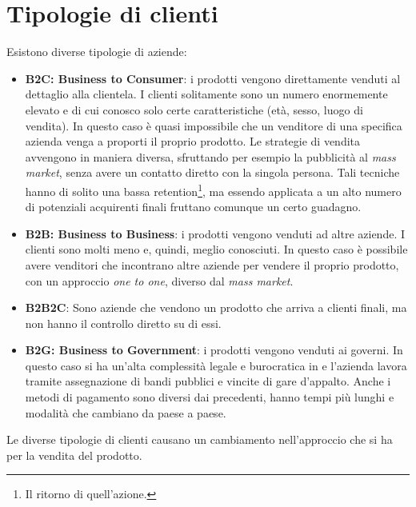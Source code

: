\section{Tipologie di clienti}

Esistono diverse tipologie di aziende:
\begin{itemize}
  \item \textbf{B2C: Business to Consumer}: i prodotti vengono direttamente
  venduti al dettaglio alla clientela. I clienti solitamente sono un numero
  enormemente elevato e di cui conosco solo certe caratteristiche (età, sesso,
  luogo di vendita). In questo caso è quasi impossibile che un venditore di una
  specifica azienda venga a proporti il proprio prodotto. Le strategie di
  vendita avvengono in maniera diversa, sfruttando per esempio la pubblicità al
  \textit{mass market}, senza avere un contatto diretto con la singola persona.
  Tali tecniche hanno di solito una bassa retention\footnote{Il ritorno di
  quell'azione.}, ma essendo applicata a un alto numero di potenziali
  acquirenti finali fruttano comunque un certo guadagno.

  \item \textbf{B2B: Business to Business}: i prodotti vengono venduti ad altre
  aziende. I clienti sono molti meno e, quindi, meglio conosciuti. In questo
  caso è possibile avere venditori che incontrano altre aziende per vendere il
  proprio prodotto, con un approccio \textit{one to one}, diverso dal
  \textit{mass market}.

  \item \textbf{B2B2C}: Sono aziende che vendono un prodotto che arriva a
  clienti finali, ma non hanno il controllo diretto su di essi.

  \item \textbf{B2G: Business to Government}: i prodotti vengono venduti ai
  governi. In questo caso si ha un'alta complessità legale e burocratica in e
  l'azienda lavora tramite assegnazione di bandi pubblici e vincite di gare
  d'appalto. Anche i metodi di pagamento sono diversi dai precedenti, hanno
  tempi più lunghi e modalità che cambiano da paese a paese.
\end{itemize}

Le diverse tipologie di clienti causano un cambiamento nell'approccio che si ha
per la vendita del prodotto.
